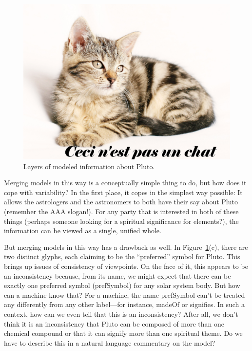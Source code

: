 \begin{figure}
    \centering
    \includegraphics[width=5.0in]{media/imageX.jpg}
    \caption{Layers of modeled information about Pluto.}
    \label{fig:ch2.3}
\end{figure}

Merging models in this way is a conceptually simple thing to do, but how
does it cope with variability? In the first place, it copes in the
simplest way possible: It allows the astrologers and the astronomers to
both have their say about Pluto (remember the AAA slogan!). For any
party that is interested in both of these things (perhaps someone
looking for a spiritual significance for elements?), the information can
be viewed as a single, unified whole.

But merging models in this way has a drawback as well. In Figure~\ref{fig:ch2.3}(c),
there are two distinct glyphs, each claiming to be the ``preferred''
symbol for Pluto. This brings up issues of consistency of viewpoints. On
the face of it, this appears to be an inconsistency because, from its
name, we might expect that there can be exactly one preferred symbol
(prefSymbol) for any solar system body. But how can a machine know that?
For a machine, the name prefSymbol can't be treated any differently from
any other label---for instance, madeOf or signifies. In such a context,
how can we even tell that this is an inconsistency? After all, we don't
think it is an inconsistency that Pluto can be composed of more than one
chemical compound or that it can signify more than one spiritual theme.
Do we have to describe this in a natural language commentary on the
model?

